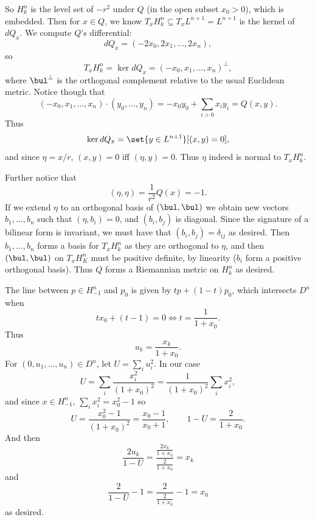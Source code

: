 \eprob

\benum
    \item So $H^n_k$ is the level set of $-r^2$ under $Q$ (in the open subset $x_0>0$), which is embedded.
    Then for $x\in Q$, we know $T_xH^n_k\subseteq T_xL^{n+1}=L^{n+1}$ is the kernel of $dQ_x$.
    We compute $Q$'s differential:
    $$ dQ_x = (-2x_0,2x_1,\dots,2x_n) , $$
    so
    $$ T_xH^n_k = \ker dQ_x = (-x_0,x_1,\dots,x_n)^\perp , $$
    where $\bul^\perp$ is the orthogonal complement relative to the usual Euclidean metric.
    Notice though that
    $$ (-x_0,x_1,\dots,x_n)\cdot(y_0,\dots,y_n) = -x_0y_0 + \sum_{i>0}x_iy_i = Q(x,y) . $$
    Thus
    $$ \ker dQ_x = \set{y\in L^{n+1}}[(x,y)=0] , $$
    and since $\eta=x/r$, $(x,y)=0$ iff $(\eta,y)=0$.
    Thus $\eta$ indeed is normal to $T_xH^n_k$.

    Further notice that
    $$ (\eta,\eta) = \frac1{r^2}Q(x) = -1 . $$
    If we extend $\eta$ to an orthogonal basis of $(\bul,\bul)$ we obtain new vectors $b_1,\dots,b_n$ such that $(\eta,b_i)=0$, and
    $(b_i,b_j)$ is diagonal.
    Since the signature of a bilinear form is invariant, we must have that $(b_i,b_j)=\delta_{ij}$ as desired.
    Then $b_1,\dots,b_n$ forms a basis for $T_xH^n_k$ as they are orthogonal to $\eta$, and then $(\bul,\bul)$ on $T_xH^n_K$ must be positive
    definite, by linearity ($b_i$ form a positive orthogonal basis).
    Thus $Q$ forms a Riemannian metric on $H^n_k$ as desired.

    \item The line between $p\in H^n_{-1}$ and $p_0$ is given by $tp+(1-t)p_0$, which intersects $D^n$ when
    $$ tx_0 + (t-1) = 0 \iff t = \frac1{1+x_0} . $$
    Thus
    $$ u_k = \frac{x_k}{1+x_0} . $$
    For $(0,u_1,\dots,u_n)\in D^n$, let $U=\sum_iu_i^2$.
    In our case
    $$ U = \sum_i \frac{x_i^2}{(1+x_0)^2} = \frac1{(1+x_0)^2}\sum_ix_i^2 , $$
    and since $x\in H^n_{-1}$, $\sum_ix_i^2=x_0^2-1$ so
    $$ U = \frac{x_0^2-1}{(1+x_0)^2} = \frac{x_0-1}{x_0+1} ,\qquad 1 - U = \frac2{1+x_0} . $$
    And then
    $$ \frac{2u_k}{1-U} = \frac{\frac{2x_k}{1+x_0}}{\frac2{1+x_0}} = x_k $$
    and
    $$ \frac2{1-U} - 1 = \frac2{\frac2{1+x_0}} - 1 = x_0 $$
    as desired.

